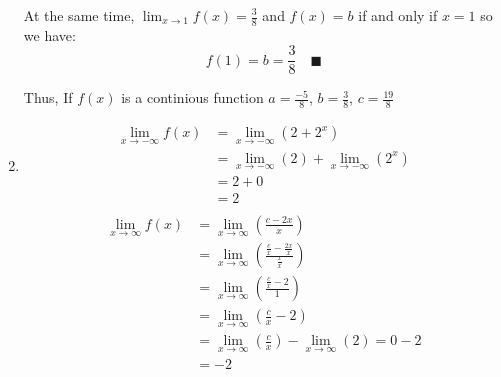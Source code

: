 \documentclass{article}
\begin{document}
\begin{enumerate}[label=({\alph*})]
        At the same time, \(\lim_{x \to 1}f(x) = \frac{3}{8}\) and \(f(x) = b\) if and only if \(x = 1\) so we have:
        \[f(1) = b = \frac{3}{8} \quad \blacksquare\]

        Thus, If \(f(x)\) is a continious function \(a = \frac{-5}{8}\), \(b = \frac{3}{8}\), \(c = \frac{19}{8}\)

        \item
        \begin{align*}
            \lim_{x \to -\infty} f(x) &= \lim_{x \to -\infty} (2 + 2^x)\\
                                    &= \lim_{x \to -\infty} (2) + \lim_{x \to -\infty}(2^x)\\
                                    &=  2 + 0\\
                                    &= 2\\
        \end{align*}
        \begin{align*}
            \lim_{x \to \infty} f(x) &= \lim_{x \to \infty} (\frac{c - 2x}{x})\\
                                    &= \lim_{x \to \infty} (\frac{\frac{c}{x} - \frac{2x}{x}}{\frac{x}{x}}) \\
                                    &= \lim_{x \to \infty} (\frac{\frac{c}{x} - 2}{1}) \\
                                    &= \lim_{x \to \infty} (\frac{c}{x} - 2) \\
                                    &=  \lim_{x \to \infty} (\frac{c}{x}) - \lim_{x \to \infty} (2) = 0 - 2\\
                                    &= -2    \\
        \end{align*}
	\end{enumerate}

    \newpage
\end{document}
